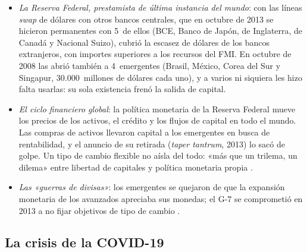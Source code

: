 \documentclass[11pt]{article}
\begin{document}
\begin{itemize}
\item \emph{La Reserva Federal, prestamista de última instancia del mundo}: con las líneas \emph{swap} de dólares con otros bancos centrales, que en octubre de 2013 se hicieron permanentes con 5~de ellos (BCE, Banco de Japón, de Inglaterra, de Canadá y Nacional Suizo), cubrió la escasez de dólares de los bancos extranjeros, con importes superiores a los recursos del FMI\nocite{FED2008Conjunta,Fed2026Swaps}. En octubre de 2008 las abrió también a 4~emergentes (Brasil, México, Corea del Sur y Singapur, 30.000~millones de dólares cada uno), y a varios ni siquiera les hizo falta usarlas: su sola existencia frenó la salida de capital.
\item \emph{El ciclo financiero global}: la política monetaria de la Reserva Federal mueve los precios de los activos, el crédito y los flujos de capital en todo el mundo. Las compras de activos llevaron capital a los emergentes en busca de rentabilidad, y el anuncio de su retirada (\emph{taper tantrum}, 2013) lo sacó de golpe. Un tipo de cambio flexible no aísla del todo: «más que un trilema, un dilema» entre libertad de capitales y política monetaria propia\nocite{Rey2013Dilema} .
\item \emph{Las «guerras de divisas»}: los emergentes se quejaron de que la expansión monetaria de los avanzados apreciaba sus monedas; el G-7 se comprometió en 2013 a no fijar objetivos de tipo de cambio\nocite{G72013Divisas} .
\end{itemize}

\subsection{La crisis de la COVID-19}\label{sec:covid}
\end{document}
